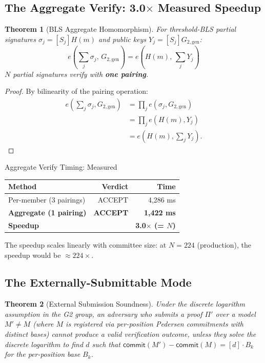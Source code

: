 \documentclass[11pt, a4paper]{article}
\theoremstyle{plain}
\newtheorem{theorem}{Theorem}
\theoremstyle{definition}
\theoremstyle{remark}
\begin{document}
\subsection{The Aggregate Verify: 3.0$\times$ Measured Speedup}

\begin{theorem}[BLS Aggregate Homomorphism]
\label{thm:bls-agg}
For threshold-BLS partial signatures
 $\sigma_j = [S_j]H(m)$ and public keys $Y_j = [S_j]G_{2,\mathrm{gen}}$:
\begin{equation}
e\!\left(\textstyle\sum_j \sigma_j,\, G_{2,\mathrm{gen}}\right) =
e\!\left(H(m),\, \textstyle\sum_j Y_j\right)
\end{equation}
 $N$ partial signatures verify with \textbf{one pairing}.
\end{theorem}
\begin{proof}
By bilinearity of the pairing operation:
\begin{align}
e\!\left(\textstyle\sum_j \sigma_j, G_{2,\mathrm{gen}}\right)
&= \prod_j e(\sigma_j, G_{2,\mathrm{gen}})\\
&= \prod_j e(H(m), Y_j)\\
&= e\!\left(H(m), \textstyle\sum_j Y_j\right).
\end{align}
\end{proof}

\begin{resultbox}{Aggregate Verify Timing: Measured}
\centering
\begin{tabular}{lrr}
\toprule
\textbf{Method} & \textbf{Verdict} & \textbf{Time} \\
\midrule
Per-member (3 pairings) & ACCEPT & 4{,}286 ms \\
\rowcolor{hsmaGreen!15}
\textbf{Aggregate (1 pairing)} & \textbf{ACCEPT} & \textbf{1{,}422 ms} \\
\midrule
\textcolor{hsmaGreen}{\textbf{Speedup}} & & \textcolor{hsmaGreen}{\textbf{3.0$\times$ (= $N$)}} \\
\bottomrule
\end{tabular}
\end{resultbox}

The speedup scales linearly with committee size: at $N = 224$ (production), the speedup would be $\approx 224\times$.

\subsection{The Externally-Submittable Mode}

\begin{theorem}[External Submission Soundness]
\label{thm:ext-submission}
Under the discrete logarithm assumption in the G2 group, an adversary
who submits a proof $\Pi'$ over a model $M' \neq M$ (where $M$ is
registered via per-position Pedersen commitments with distinct bases)
cannot produce a valid verification outcome, unless they solve the
discrete logarithm to find $d$ such that
 $\textsf{commit}(M') - \textsf{commit}(M) = [d] \cdot B_k$ for the
per-position base $B_k$.
\end{theorem}
\end{document}
